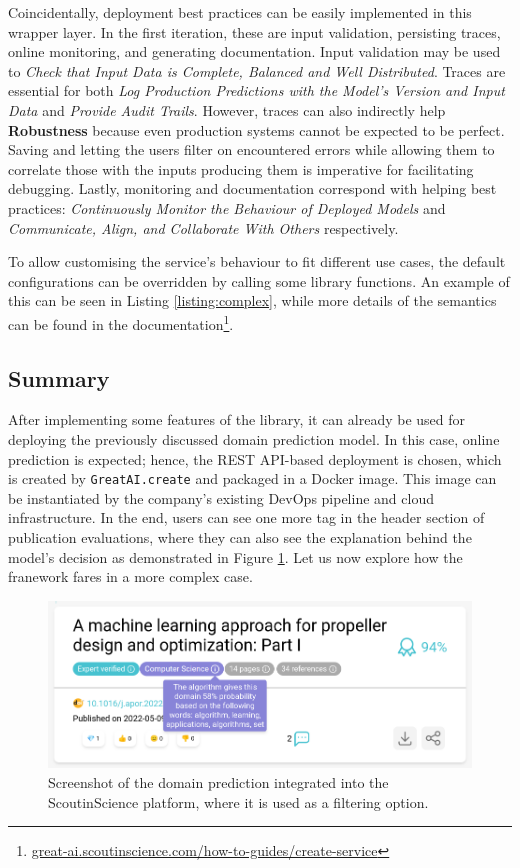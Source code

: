 Coincidentally, deployment best practices can be easily implemented in this wrapper layer. In the first iteration, these are input validation, persisting traces, online monitoring, and generating documentation. Input validation may be used to \textit{Check that Input Data is Complete, Balanced and Well Distributed}. Traces are essential for both \textit{Log Production Predictions with the Model's Version and Input Data} and \textit{Provide Audit Trails}. However, traces can also indirectly help \textbf{Robustness} because even production systems cannot be expected to be perfect. Saving and letting the users filter on encountered errors while allowing them to correlate those with the inputs producing them is imperative for facilitating debugging. Lastly, monitoring and documentation correspond with helping best practices: \textit{Continuously Monitor the Behaviour of Deployed Models} and \textit{Communicate, Align, and Collaborate With Others} respectively.

To allow customising the service's behaviour to fit different use cases, the default configurations can be overridden by calling some library functions. An example of this can be seen in Listing \ref{listing:complex}, while more details of the semantics can be found in the documentation\footnote{\href{https://great-ai.scoutinscience.com/how-to-guides/create-service/}{great-ai.scoutinscience.com/how-to-guides/create-service}}.

\subsection{Summary}

After implementing some features of the library, it can already be used for deploying the previously discussed domain prediction model. In this case, online prediction is expected; hence, the REST API-based deployment is chosen, which is created by \texttt{GreatAI.create} and packaged in a Docker image. This image can be instantiated by the company's existing DevOps pipeline and cloud infrastructure. In the end, users can see one more tag in the header section of publication evaluations, where they can also see the explanation behind the model's decision as demonstrated in Figure \ref{fig:dashboard-domains}. Let us now explore how the franework fares in a more complex case.

\begin{figure}[H]
    \centering
    \includegraphics[width=0.7\linewidth]{figures/dashboard-domains.png}
    \captionsetup{width=.9\linewidth}
    \caption{Screenshot of the domain prediction integrated into the ScoutinScience platform, where it is used as a filtering option.}
    \label{fig:dashboard-domains}
\end{figure}
